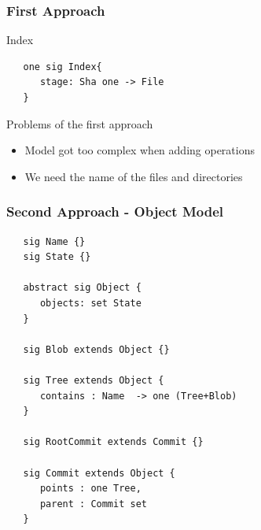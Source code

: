\documentclass{beamer}
\begin{document}
\begin{frame}[fragile]
   \frametitle{First Approach}
   \begin{block}{Index}
   \footnotesize
   \begin{lstlisting}
   one sig Index{
      stage: Sha one -> File
   }
   \end{lstlisting}
   \end{block}
   \begin{block}{Problems of the first approach}
      \begin{itemize}
         \item Model got too complex when adding operations
         \item We need the name of the files and directories
      \end{itemize}
   \end{block}
\end{frame}


\begin{frame}[fragile]
   \frametitle{Second Approach - Object Model}
   \footnotesize
   \begin{lstlisting}
   sig Name {}
   sig State {}

   abstract sig Object {
      objects: set State
   }

   sig Blob extends Object {}

   sig Tree extends Object {
      contains : Name  -> one (Tree+Blob)
   }
   
   sig RootCommit extends Commit {}

   sig Commit extends Object {
      points : one Tree,
      parent : Commit set
   }

   \end{lstlisting}
%

\end{frame}
\end{document}

